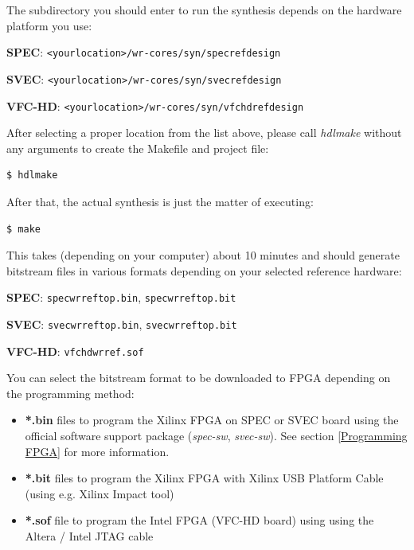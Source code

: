 \documentclass[a4paper, 12pt]{article}
\renewcommand{\_}{\underscore\allowbreak}
\begin{document}
\vspace{1em}
The subdirectory you should enter to run the synthesis depends on the hardware
platform you use:
\begin{itemize*}
  \item \textbf{SPEC}: \texttt{<your\_location>/wr-cores/syn/spec\_ref\_design}
  \item \textbf{SVEC}: \texttt{<your\_location>/wr-cores/syn/svec\_ref\_design}
  \item \textbf{VFC-HD}: \texttt{<your\_location>/wr-cores/syn/vfchd\_ref\_design}
\end{itemize*}

After selecting a proper location from the list above, please call
\textit{hdlmake} without any arguments to create the Makefile and project file:
\begin{lstlisting}
$ hdlmake
\end{lstlisting}

After that, the actual synthesis is just the matter of executing:
\begin{lstlisting}
$ make
\end{lstlisting}

This takes (depending on your computer) about 10 minutes and should generate
bitstream files in various formats depending on your selected reference
hardware:
\begin{itemize*}
  \item \textbf{SPEC}: \texttt{spec\_wr\_ref\_top.bin}, \texttt{spec\_wr\_ref\_top.bit}
  \item \textbf{SVEC}: \texttt{svec\_wr\_ref\_top.bin}, \texttt{svec\_wr\_ref\_top.bit}
  \item \textbf{VFC-HD}: \texttt{vfchd\_wr\_ref.sof}
\end{itemize*}

You can select the bitstream format to be downloaded to FPGA depending on the
programming method:
\begin{itemize}
  \item \textbf{*.bin} files to program the Xilinx FPGA on SPEC or SVEC board
    using the official software support package (\textit{spec-sw},
    \textit{svec-sw}). See section \ref{Programming FPGA} for more
    information.
  \item \textbf{*.bit} files to program the Xilinx FPGA with Xilinx USB Platform
    Cable (using e.g. Xilinx Impact tool)
  \item \textbf{*.sof} file to program the Intel FPGA (VFC-HD board) using using
    the Altera / Intel JTAG cable
\end{itemize}
\end{document}
